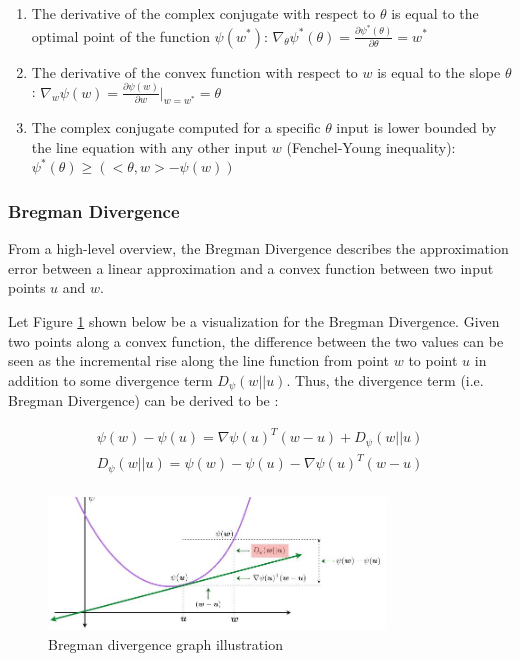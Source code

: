 \documentclass[11pt]{article}
\begin{document}
\begin{enumerate}
    \item The derivative of the complex conjugate with respect to $\theta$ is equal to the optimal point of the function $\psi(w^*)$: $\nabla_\theta \psi^*(\theta) = \frac{\partial \psi^*(\theta)}{\partial \theta} = w^*$
    \item The derivative of the convex function with respect to $w$ is equal to the slope $\theta$: $\nabla_w \psi(w) = \frac{\partial \psi(w)}{\partial w} |_{w=w^*} = \theta$
    \item The complex conjugate computed for a specific $\theta$ input is lower bounded by the line equation with any other input $w$ (Fenchel-Young inequality): $\psi^*(\theta) \geq (<\theta, w> - \psi(w))$
\end{enumerate}

\subsubsection{Bregman Divergence}

From a high-level overview, the Bregman Divergence describes the approximation error between a linear approximation and a convex function between two input points $u$ and $w$.

Let Figure \ref{fig:bregman_divergence_graph} shown below be a visualization for the Bregman Divergence. Given two points along a convex function, the difference between the two values can be seen as the incremental rise along the line function from point $w$ to point $u$ in addition to some divergence term $D_{\psi}(w||u)$. Thus, the divergence term (i.e. Bregman Divergence) can be derived to be \cite{wiki:Bregman_divergence}:

\begin{gather*}
    \psi (w) - \psi (u) = \nabla \psi(u)^T (w-u) + D_{\psi}(w||u) \\ 
    D_{\psi}(w||u) = \psi(w) - \psi(u) - \nabla \psi(u)^T (w-u) \\ 
\end{gather*}

\begin{figure}[H]
    \centering
    \includegraphics[width=0.8\textwidth]{bregman_divergence_graph.JPG}
    \caption{Bregman divergence graph illustration}
    \label{fig:bregman_divergence_graph}
\end{figure}
\end{document}
